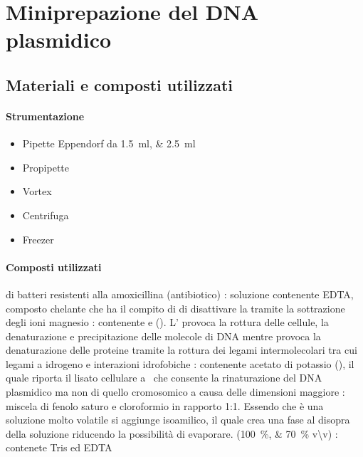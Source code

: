 \section{Miniprepazione del DNA plasmidico}

\subsection{Materiali e composti utilizzati}
\paragraph{Strumentazione}
\begin{itemize}[person]
	\item Pipette \foreignlanguage{german}{Eppendorf} da \qtylist{1.5;2.5}{\ml}
	\item Propipette
	\item \foreignlanguage{english}{Vortex}
	\item Centrifuga
	\item Freezer
\end{itemize}

\paragraph{Composti utilizzati}
\begin{itemize}[person]
	 di batteri resistenti alla amoxicillina (antibiotico)
	\itemb[\slz I]: soluzione contenente EDTA, composto chelante che ha il compito di di disattivare la  tramite la sottrazione degli ioni magnesio 
	\itemb[\slz II]: contenente  e  (). L' provoca la rottura delle cellule, la denaturazione e precipitazione delle molecole di DNA mentre  provoca la denaturazione delle proteine tramite la rottura dei legami intermolecolari tra cui legami a idrogeno e interazioni idrofobiche
	: contenente acetato di potassio (), il quale riporta il lisato cellulare a \pH\ che consente la rinaturazione del DNA plasmidico ma non di quello cromosomico a causa delle dimensioni maggiore  
	: miscela di fenolo saturo e cloroformio in rapporto 1:1. Essendo che è una soluzione molto volatile si aggiunge isoamilico, il quale crea una fase al disopra della soluzione riducendo la possibilità di evaporare. 
	 (\qtylist{100;70}{\percent} v\textbackslash v)
	\itemb[\slz di TE]: contenete Tris ed EDTA
\end{itemize}


